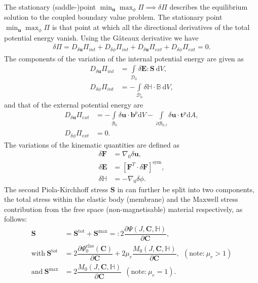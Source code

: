 \documentclass[11pt,a4paper,final]{article}
\begin{document}
The stationary (saddle-)point $\min_{\mathbf{u}} \max_{\phi} \Pi \implies \delta \Pi$ describes the equilibrium solution to the coupled boundary value problem. The stationary point $\min_{\mathbf{u}} \max_{\phi} \Pi$ is that point at which all the directional derivatives of the total potential energy vanish. Using the G\^ateaux derivative we have
\begin{align}
\delta \Pi = D_{\delta \mathbf{u}} \Pi_{int} + D_{\delta \phi} \Pi_{int} + D_{\delta \mathbf{u}} \Pi_{ext} + D_{\delta \phi} \Pi_{ext} = 0.
\label{eq:3.25}
\end{align}
The components of the variation of the internal potential energy are given as \cite{Saxena2015}
\begin{align}
D_{\delta \mathbf{u}} \Pi_{int} &= \int\limits_{\mathcal{D}_0} \delta \mathbf{E} : \mathbf{S} \ \mathrm{d}V, \label{eq:3.26.1}\\
D_{\delta \phi} \Pi_{int} &= -\int\limits_{\mathcal{D}_0} \delta \mathbb{H} \cdot \mathbb{B} \ \mathrm{d}V,
\label{eq:3.26.2}
\end{align}
and that of the external potential energy are
\begin{align}
D_{\delta \mathbf{u}} \Pi_{ext} &= -\int\limits_{\mathcal{B}_0} \delta \mathbf{u} \cdot \mathbf{b}^p \mathrm{d}V - \int\limits_{\partial \mathcal{B}_{0,t}} \delta \mathbf{u} \cdot \mathbf{t}^p \mathrm{d}A, \label{eq:3.27.1}\\
D_{\delta \phi} \Pi_{ext} &= 0.
\label{eq:3.27.2}
\end{align}
The variations of the kinematic quantities are defined as 
\begin{align}
\delta \mathbf{F} &= \nabla_0 \delta \mathbf{u}, \\
\delta \mathbf{E} &= \left[ \mathbf{F}^T \cdot \delta \mathbf{F} \right]^{\text{sym}}, \\ 
\delta \mathbb{H} &= -\nabla_0 \delta \phi.
\label{eq:3.28}
\end{align}
The second Piola-Kirchhoff stress $\mathbf{S}$ in  can further be split into two components, the total stress within the elastic body (membrane) and the Maxwell stress contribution from the free space (non-magnetisable) material respectively, as follows:
\begin{align}
\mathbf{S} &= \mathbf{S}^{\text{tot}} + \mathbf{S}^{\text{max}} =: 2 \dfrac{\partial \Psi (J, \mathbf{C}, \mathbb{H})}{\partial \mathbf{C}}, \\
\text{with} \ \mathbf{S}^{\text{tot}} &= 2 \dfrac{\partial \Psi_0^{\text{elas}} (\mathbf{C})}{\partial \mathbf{C}} + 2 \mu_r \dfrac{M_0 (J, \mathbf{C}, \mathbb{H})}{\partial \mathbf{C}}, \ \ (\text{note:} \ \mu_r > 1)\\
\text{and} \ \mathbf{S}^{\text{max}} &= 2 \dfrac{M_0 (J, \mathbf{C}, \mathbb{H})}{\partial \mathbf{C}}  \ \ (\text{note:} \ \mu_r = 1).
\end{align}
\end{document}
